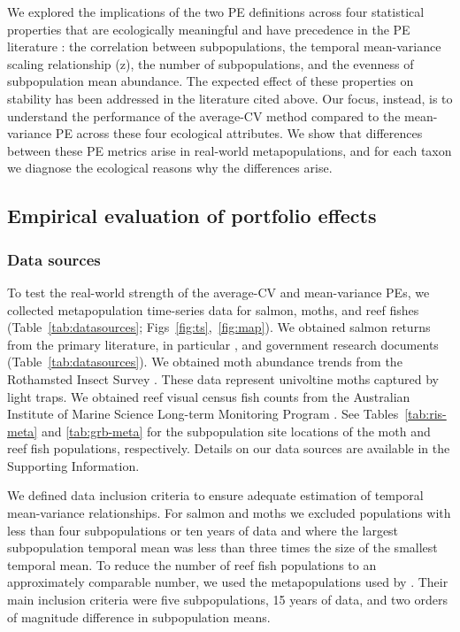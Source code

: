 We explored the implications of the two PE definitions across four statistical
properties that are ecologically meaningful and have precedence in the PE
literature \citep{tilman1999, cottingham2001, loreau2010,
thibaut2012}: the correlation between subpopulations, the temporal
mean-variance scaling relationship (z), the number of subpopulations, and the
evenness of subpopulation mean abundance. The expected effect of these
properties on  stability
has been addressed in the literature cited
above. Our focus, instead, is to understand the performance of the average-CV
method compared to the mean-variance PE across these four ecological
attributes. We show that differences between these PE metrics arise in
real-world metapopulations, and for each taxon we diagnose the ecological
reasons why the differences arise.

\subsection{Empirical evaluation of portfolio effects}

\subsubsection{Data sources}

To test the real-world strength of the average-CV and mean-variance PEs, we
collected metapopulation time-series data for salmon, moths, and reef fishes
(Table~\ref{tab:datasources}; Figs~\ref{fig:ts},~\ref{fig:map}).
We obtained salmon returns from the primary
literature, in particular \citet{dorner2008}, and government research
documents (Table~\ref{tab:datasources}). We obtained moth abundance trends from
the Rothamsted Insect Survey \citep{conrad2004}. These data represent
univoltine moths captured by light traps. We obtained reef visual census fish
counts from the Australian Institute of Marine Science Long-term Monitoring
Program \citep{sweatman2008}. See Tables~\ref{tab:ris-meta} and
\ref{tab:grb-meta} for the subpopulation site locations of the moth and reef
fish populations, respectively. Details on our data sources are available in the
Supporting Information.

We defined data inclusion criteria to ensure adequate estimation of temporal
mean-variance relationships. For salmon and moths we excluded populations
with less than four subpopulations or ten years of data and where the largest
subpopulation temporal mean was less than three times the size of the smallest
temporal mean. To reduce the number of reef fish populations to an
approximately comparable number, we used the metapopulations used by
\citet{mellin2010}. Their main inclusion criteria were five
subpopulations, 15 years of data, and two orders of magnitude difference in
subpopulation means.

